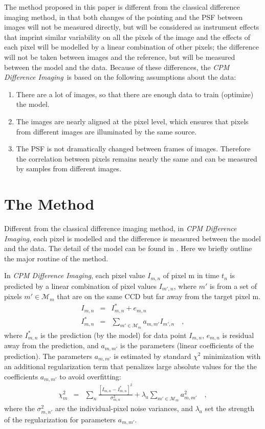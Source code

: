 \documentclass[12pt, preprint]{aastex}
\newcommand{\project}[1]{\textsl{#1}}
\newcommand{\cpmdiff}{\project{CPM Difference Imaging}}
\newcommand{\set}[1]{\mathcal{#1}}
\begin{document}
The method proposed in this paper is different from the classical difference imaging method, in that both changes of the pointing and the PSF between images will not be measured directly, but will be considered as instrument effects that imprint similar variability on all the pixels of the image and the effects of each pixel will be modelled by a linear combination of other pixels;  the difference will not be taken between images and the reference, but will be measured between the model and the data.
Because of these differences, the \cpmdiff\ is based on the following assumptions about the data:
\begin{enumerate}
\item
There are a lot of images, so that there are enough data to train (optimize) the model.
\item
The images are nearly aligned at the pixel level, which ensures that pixels from different images are illuminated by the same source.
\item
The PSF is not dramatically changed between frames of images. Therefore the correlation between pixels remains nearly the same and can be measured by samples from different images.
\end{enumerate}

\section{The Method}
Different from the classical difference imaging method, in \cpmdiff, each pixel is modelled and the difference is measured between the model and the data. The detail of the model can be found in \cite{cpm}. Here we briefly outline the major routine of the method.

In \cpmdiff, each pixel value $I_{m,n}$ of pixel m in time $t_n$ is predicted by a linear combination of pixel values $I_{m',n}$, where $m'$ is from a set of pixels $m'\in\set{M}_m$ that are on the same CCD but far away from the target pixel m.
\begin{eqnarray}
I_{m,n}         &=& I^{\ast}_{m,n} + e_{m,n}
\\
I^{\ast}_{m,n}  &=& \sum_{m'\in\set{M}_m} a_{m,m'}I_{m',n} 
\quad,
\end{eqnarray}
where $I^{\ast}_{m,n}$ is the prediction (by the model) for data point $I_{m,n}$, $e_{m,n}$ is residual away from the prediction, and $a_{m,m'}$ is the parameters (linear coefficients of the prediction).
The parameters $a_{m,m'}$ is estimated by standard $\chi^2$ minimization with an additional regularization term that penalizes large absolute values for the the coefficients $a_{m,m'}$ to avoid overfitting:
\begin{eqnarray}
\chi^2_{m}    &=& \sum_{n} \frac{[I_{m,n} - I^{\ast}_{m,n}]^2}{\sigma^2_{m,n}}+ \lambda_{a}\sum_{m'\in\set{M}_m}a_{m,m'}^2 
\quad,
\end{eqnarray}
where the $\sigma^2_{m,n'}$ are the individual-pixel noise variances, and $\lambda_{a}$ set the strength of the regularization for parameters $a_{m,m'}$.
\end{document}
